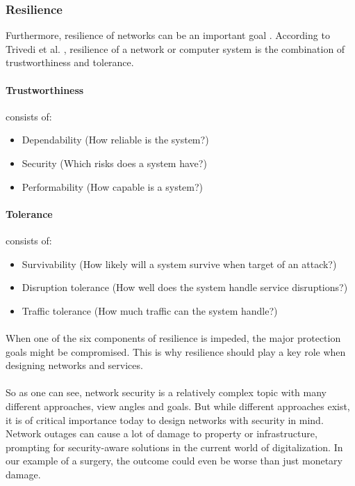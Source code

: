 
\subsubsection{Resilience}
Furthermore, resilience of networks can be an important goal \cite{resilience}. According to Trivedi et al. \cite{resilience}, resilience of a network or computer system is the combination of trustworthiness and tolerance.

\paragraph{Trustworthiness} consists of:
\begin{itemize}
    \item Dependability (How reliable is the system?)
    \item Security (Which risks does a system have?)
    \item Performability (How capable is a system?)
\end{itemize}

\paragraph{Tolerance} consists of:
\begin{itemize}
    \item Survivability (How likely will a system survive when target of an attack?)
    \item Disruption tolerance (How well does the system handle service disruptions?)
    \item Traffic tolerance (How much traffic can the system handle?)
\end{itemize}

\paragraph{}When one of the six components of resilience is impeded, the major protection goals might be compromised. This is why resilience should play a key role when designing networks and services.

\paragraph{}So as one can see, network security is a relatively complex topic with many different approaches, view angles and goals. But while different approaches exist, it is of critical importance today to design networks with security in mind. Network outages can cause a lot of damage to property or infrastructure, prompting for security-aware solutions in the current world of digitalization. In our example of a surgery, the outcome could even be worse than just monetary damage.

